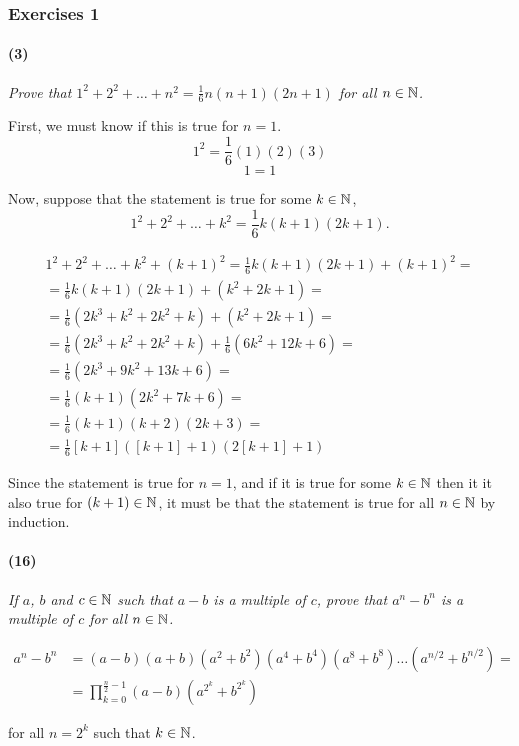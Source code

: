 \subsubsection{Exercises 1}

\paragraph{(3)}

\textit{Prove that $1^2+2^2+\hdots+n^2=\frac{1}{6}n(n+1)(2n+1)$ for all $n\in\mathbb{N}$.}

First, we must know if this is true for $n=1$.
$$1^2=\frac{1}{6}(1)(2)(3)$$
$$1=1$$

Now, suppose that the statement is true for some $k\in\mathbb{N}$, 
$$1^2+2^2+\hdots+k^2=\frac{1}{6}k(k+1)(2k+1).$$

\begin{align*}
	1^2+2^2+\hdots+k^2+(k+1)^2=\frac{1}{6}k(k+1)(2k+1) + (k+1)^2 = \\
	=\frac{1}{6}k(k+1)(2k+1) + (k^2+2k+1) = \\
	= \frac{1}{6}(2k^3+k^2+2k^2+k)+(k^2+2k+1) = \\
	= \frac{1}{6}(2k^3+k^2+2k^2+k)+\frac{1}{6}(6k^2+12k+6) = \\
	= \frac{1}{6}(2k^3+9k^2+13k+6) = \\
	= \frac{1}{6}(k+1)(2k^2+7k+6) = \\
	= \frac{1}{6}(k+1)(k+2)(2k+3) = \\
	= \frac{1}{6}[k+1]([k+1]+1)(2[k+1]+1)
\end{align*}

Since the statement is true for $n=1$, and if it is true for some $k\in\mathbb{N}$ then it it also true for $(k+1)\in\mathbb{N}$, it must be that the statement is true for all $n\in\mathbb{N}$ by induction.

\newpage
\paragraph{(16)}

\textit{If $a$, $b$ and $c\in\mathbb{N}$ such that $a-b$ is a multiple of $c$, prove that $a^n-b^n$ is a multiple of $c$ for all $n\in\mathbb{N}$.}

\begin{align*}
	a^n-b^n &= (a-b)(a+b)(a^2+b^2)(a^4+b^4)(a^8+b^8)\hdots(a^{n/2}+b^{n/2}) = \\
	&=\prod_{k=0}^{\frac{n}{2}-1} (a-b)(a^{2^k}+b^{2^k})
\end{align*}

for all $n=2^k$ such that $k\in\mathbb{N}$.

